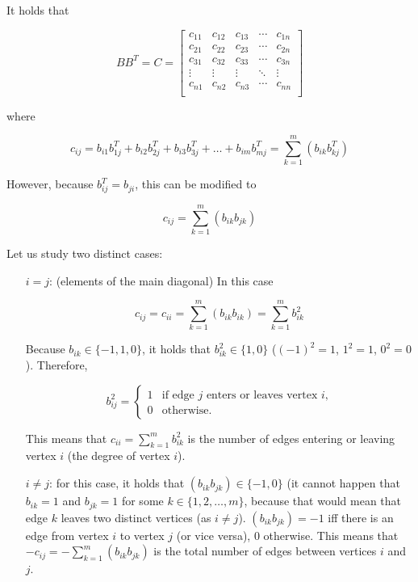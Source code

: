 It holds that

$$
B B^{T} = C =
\left[
\begin{array}{*{5}{c}}
  c_{11} & c_{12} & c_{13} & \cdots & c_{1n} \\
  c_{21} & c_{22} & c_{23} & \cdots & c_{2n} \\
  c_{31} & c_{32} & c_{33} & \cdots & c_{3n} \\
  \vdots & \vdots & \vdots & \ddots & \vdots \\
  c_{n1} & c_{n2} & c_{n3} & \cdots & c_{nn} \\
\end{array}
\right]
$$

where

$$
c_{ij} = b_{i1} b^{T}_{1j} + b_{i2} b^{T}_{2j} + b_{i3} b^{T}_{3j} + \dots
+ b_{im} b^{T}_{mj} =
\sum_{k=1}^{m}(b_{ik} b^{T}_{kj})
$$

However, because $b^{T}_{ij} = b_{ji}$, this can be modified to

$$
c_{ij} = \sum_{k=1}^{m}(b_{ik} b_{jk})
$$

Let us study two distinct cases:

\begin{enumerate}

  \item[$i = j$:] (elements of the main diagonal) In this case

  $$
  c_{ij} = c_{ii} = \sum_{k=1}^{m}(b_{ik} b_{ik}) = \sum_{k=1}^{m} b_{ik}^{2}
  $$

  Because $b_{ik} \in \{-1, 1, 0\}$, it holds that $b_{ik}^{2} \in \{1, 0\}$
  ($(-1)^{2} = 1$, $1^{2} = 1$, $0^{2} = 0$). Therefore,

  $$
  b_{ij}^2 =
  \left\{
  \begin{array}{ll}
     1 & \mbox{if edge $j$ enters or leaves vertex $i$,} \\
     0 & \mbox{otherwise}.
  \end{array}
  \right.
  $$

  This means that $c_{ii} = \sum_{k=1}^{m} b_{ik}^{2}$ is the number of edges
  entering or leaving vertex $i$ (the degree of vertex $i$).


  \item[$i \ne j$:] for this case, it holds that $(b_{ik} b_{jk}) \in \{-1,
  0\}$ (it cannot happen that $b_{ik} = 1$ and $b_{jk} = 1$ for some $k \in
  \{1, 2, \dots, m\}$, because that would mean that edge $k$ leaves two
  distinct vertices (as $i \ne j$). $(b_{ik} b_{jk}) = -1$ iff there is an edge
  from vertex $i$ to vertex $j$ (or vice versa), $0$ otherwise. This means that
  $-c_{ij} = -\sum_{k=1}^{m}(b_{ik} b_{jk})$ is the total number of edges
  between vertices $i$ and $j$.

\end{enumerate}



